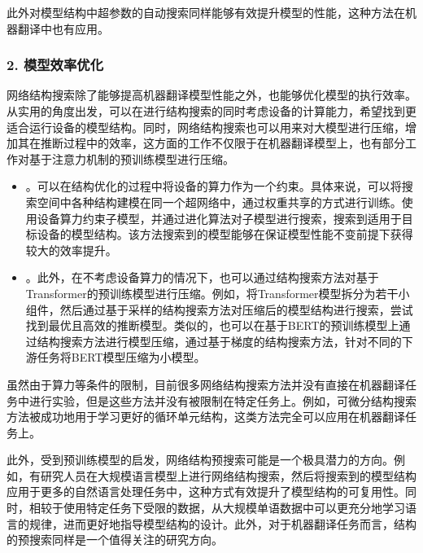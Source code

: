 \parinterval 此外对模型结构中超参数的自动搜索同样能够有效提升模型的性能，这种方法在机器翻译中也有应用。


\subsubsection{2. 模型效率优化}

\parinterval 网络结构搜索除了能够提高机器翻译模型性能之外，也能够优化模型的执行效率。从实用的角度出发，可以在进行结构搜索的同时考虑设备的计算能力，希望找到更适合运行设备的模型结构。同时，网络结构搜索也可以用来对大模型进行压缩，增加其在推断过程中的效率，这方面的工作不仅限于在机器翻译模型上，也有部分工作对基于注意力机制的预训练模型进行压缩。

\begin{itemize}
\vspace{0.5em}
\item {\small{}}。可以在结构优化的过程中将设备的算力作为一个约束。具体来说，可以将搜索空间中各种结构建模在同一个超网络中，通过权重共享的方式进行训练。使用设备算力约束子模型，并通过进化算法对子模型进行搜索，搜索到适用于目标设备的模型结构。该方法搜索到的模型能够在保证模型性能不变前提下获得较大的效率提升。
\vspace{0.5em}
\item {\small{}}。此外，在不考虑设备算力的情况下，也可以通过结构搜索方法对基于Transformer的预训练模型进行压缩。例如，将Transformer模型拆分为若干小组件，然后通过基于采样的结构搜索方法对压缩后的模型结构进行搜索，尝试找到最优且高效的推断模型。类似的，也可以在基于BERT的预训练模型上通过结构搜索方法进行模型压缩，通过基于梯度的结构搜索方法，针对不同的下游任务将BERT模型压缩为小模型。
\vspace{0.5em}
\end{itemize}

\parinterval 虽然由于算力等条件的限制，目前很多网络结构搜索方法并没有直接在机器翻译任务中进行实验，但是这些方法并没有被限制在特定任务上。例如，可微分结构搜索方法被成功地用于学习更好的循环单元结构，这类方法完全可以应用在机器翻译任务上。

\parinterval 此外，受到预训练模型的启发，网络结构预搜索可能是一个极具潜力的方向。例如，有研究人员在大规模语言模型上进行网络结构搜索，然后将搜索到的模型结构应用于更多的自然语言处理任务中，这种方式有效提升了模型结构的可复用性。同时，相较于使用特定任务下受限的数据，从大规模单语数据中可以更充分地学习语言的规律，进而更好地指导模型结构的设计。此外，对于机器翻译任务而言，结构的预搜索同样是一个值得关注的研究方向。

